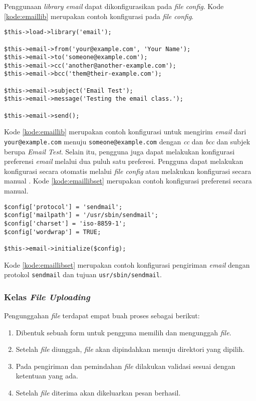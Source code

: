 Penggunaan \textit{library email} dapat dikonfigurasikan pada \textit{file config}. Kode \ref{kode:emaillib} merupakan contoh konfigurasi pada \textit{file config}.

\begin{lstlisting}[caption=Contoh konfigurasi \textit{library email}, label=kode:emaillib]
$this->load->library('email');

$this->email->from('your@example.com', 'Your Name');
$this->email->to('someone@example.com');
$this->email->cc('another@another-example.com');
$this->email->bcc('them@their-example.com');

$this->email->subject('Email Test');
$this->email->message('Testing the email class.');

$this->email->send();
\end{lstlisting}

Kode \ref{kode:emaillib} merupakan contoh konfigurasi untuk mengirim \textit{email} dari \texttt{your@example.com} menuju \texttt{someone@example.com} dengan \textit{cc} dan \textit{bcc} dan subjek berupa \textit{Email Test}. Selain itu, pengguna juga dapat melakukan konfigurasi preferensi \textit{email} melalui dua puluh satu preferesi. Pengguna dapat melakukan konfigurasi secara otomatis melalui \textit{file config} atau melakukan konfigurasi secara manual . Kode \ref{kode:emaillibset} merupakan contoh konfigurasi preferensi secara manual.

\begin{lstlisting}[caption=Contoh konfigurasi preferensi \textit{library email} secara manual, label=kode:emaillibset]
$config['protocol'] = 'sendmail';
$config['mailpath'] = '/usr/sbin/sendmail';
$config['charset'] = 'iso-8859-1';
$config['wordwrap'] = TRUE;

$this->email->initialize($config);
\end{lstlisting}
Kode \ref{kode:emaillibset} merupakan contoh konfigurasi pengiriman \textit{email} dengan protokol \texttt{sendmail} dan tujuan \texttt{usr/sbin/sendmail}.

\subsubsection{Kelas \textit{File Uploading}}
Pengunggahan \textit{file} terdapat empat buah proses sebagai berikut:
\begin{enumerate}
\item Dibentuk sebuah form untuk pengguna memilih dan mengunggah \textit{file}.
\item Setelah \textit{file} diunggah, \textit{file} akan dipindahkan menuju direktori yang dipilih.
\item Pada pengiriman dan pemindahan \textit{file} dilakukan validasi sesuai dengan ketentuan yang ada.
\item Setelah \textit{file} diterima akan dikeluarkan pesan berhasil.
\end{enumerate}

